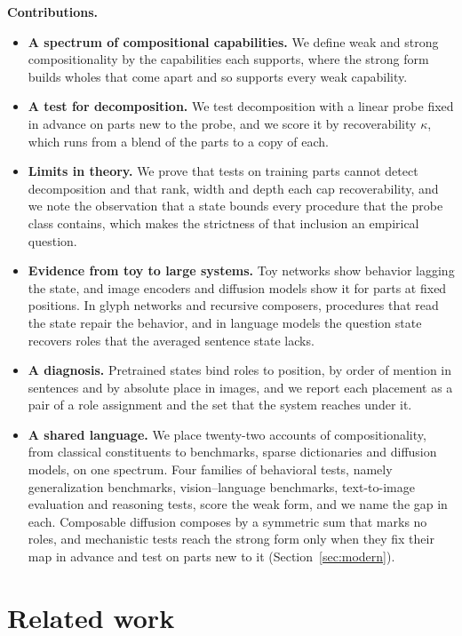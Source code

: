 \documentclass[10pt]{article}
\theoremstyle{plain}
\theoremstyle{remark}
\begin{document}
\textbf{Contributions.}
\begin{itemize}
  \item \textbf{A spectrum of compositional capabilities.} We define weak and strong compositionality by the capabilities each supports, where the strong form builds wholes that come apart and so supports every weak capability.
  \item \textbf{A test for decomposition.} We test decomposition with a linear probe fixed in advance on parts new to the probe, and we score it by recoverability $\kappa$, which runs from a blend of the parts to a copy of each.
  \item \textbf{Limits in theory.} We prove that tests on training parts cannot detect decomposition and that rank, width and depth each cap recoverability, and we note the observation that a state bounds every procedure that the probe class contains, which makes the strictness of that inclusion an empirical question.
  \item \textbf{Evidence from toy to large systems.} Toy networks show behavior lagging the state, and image encoders and diffusion models show it for parts at fixed positions. In glyph networks and recursive composers, procedures that read the state repair the behavior, and in language models the question state recovers roles that the averaged sentence state lacks.
  \item \textbf{A diagnosis.} Pretrained states bind roles to position, by order of mention in sentences and by absolute place in images, and we report each placement as a pair of a role assignment and the set that the system reaches under it.
  \item \textbf{A shared language.} We place twenty-two accounts of compositionality, from classical constituents to benchmarks, sparse dictionaries and diffusion models, on one spectrum. Four families of behavioral tests, namely generalization benchmarks, vision--language benchmarks, text-to-image evaluation and reasoning tests, score the weak form, and we name the gap in each. Composable diffusion composes by a symmetric sum that marks no roles, and mechanistic tests reach the strong form only when they fix their map in advance and test on parts new to it (Section~\ref{sec:modern}).
\end{itemize}

\section{Related work}
\label{sec:related}
\end{document}
